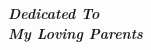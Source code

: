 \begin{center}
\vspace*{6cm}
\Huge
	\textbf{\textit{Dedicated To \\My Loving Parents }}
\end{center}